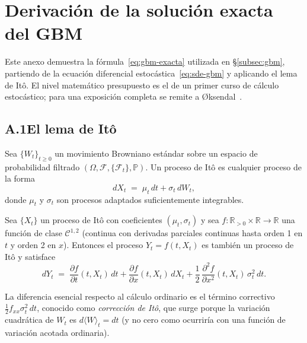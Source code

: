 \section{Derivación de la solución exacta del GBM}
\label{anexo:gbm}

Este anexo demuestra la fórmula~\eqref{eq:gbm-exacta} utilizada en §\ref{subsec:gbm}, partiendo de la ecuación diferencial estocástica~\eqref{eq:sde-gbm} y aplicando el lema de Itô. El nivel matemático presupuesto es el de un primer curso de cálculo estocástico; para una exposición completa se remite a Øksendal~\cite{oksendal2003}.

\subsection*{A.1\quad El lema de Itô}

Sea $\{W_t\}_{t \geq 0}$ un movimiento Browniano estándar sobre un espacio de probabilidad filtrado $(\Omega, \mathcal{F}, \{\mathcal{F}_t\}, \mathbb{P})$. Un proceso de Itô es cualquier proceso de la forma
\[
    dX_t \;=\; \mu_t\, dt + \sigma_t\, dW_t,
\]
donde $\mu_t$ y $\sigma_t$ son procesos adaptados suficientemente integrables.

\begin{teorema}
\label{teorema:ito}
Sea $\{X_t\}$ un proceso de Itô con coeficientes $(\mu_t, \sigma_t)$ y sea $f: \mathbb{R}_{>0} \times \mathbb{R} \to \mathbb{R}$ una función de clase $\mathcal{C}^{1,2}$ (continua con derivadas parciales continuas hasta orden 1 en $t$ y orden 2 en $x$). Entonces el proceso $Y_t = f(t, X_t)$ es también un proceso de Itô y satisface
\begin{equation}
    dY_t \;=\; \frac{\partial f}{\partial t}(t, X_t)\,dt
            + \frac{\partial f}{\partial x}(t, X_t)\,dX_t
            + \frac{1}{2}\,\frac{\partial^2 f}{\partial x^2}(t, X_t)\,\sigma_t^2\,dt.
    \label{eq:lema-ito}
\end{equation}
\end{teorema}

La diferencia esencial respecto al cálculo ordinario es el término correctivo $\frac{1}{2}f_{xx}\sigma_t^2\,dt$, conocido como \emph{corrección de Itô}, que surge porque la variación cuadrática de $W_t$ es $d\langle W\rangle_t = dt$ (y no cero como ocurriría con una función de variación acotada ordinaria).

